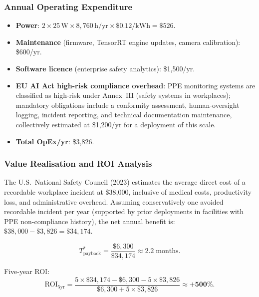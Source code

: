 \documentclass[11pt,a4paper]{article}
\begin{document}
\subsubsection*{Annual Operating Expenditure}

\begin{itemize}[leftmargin=*, noitemsep]
  \item \textbf{Power}: $2 \times 25\,\mathrm{W} \times 8{,}760\,\mathrm{h/yr}
    \times \$0.12/\mathrm{kWh} = \$526$.
  \item \textbf{Maintenance} (firmware, TensorRT engine updates,
    camera calibration): \$600/yr.
  \item \textbf{Software licence} (enterprise safety analytics):
    \$1,500/yr.
  \item \textbf{EU AI Act high-risk compliance overhead}: PPE
    monitoring systems are classified as high-risk under Annex~III
    (safety systems in workplaces); mandatory obligations include
    a conformity assessment, human-oversight logging, incident
    reporting, and technical documentation maintenance, collectively
    estimated at \$1,200/yr for a deployment of this scale.
  \item \textbf{Total OpEx/yr}: \$3,826.
\end{itemize}

\subsubsection*{Value Realisation and ROI Analysis}

The U.S.\ National Safety Council (2023) estimates the average
direct cost of a recordable workplace incident at \$38,000,
inclusive of medical costs, productivity loss, and administrative
overhead. Assuming conservatively one avoided recordable incident
per year (supported by prior deployments in facilities with PPE
non-compliance history), the net annual benefit is:
$\$38{,}000 - \$3{,}826 = \$34{,}174$.

\begin{equation*}
  T^*_\mathrm{payback} = \frac{\$6{,}300}{\$34{,}174}
  \approx \mathbf{2.2\;\mathrm{months}}.
\end{equation*}

Five-year ROI:
\begin{equation*}
  \mathrm{ROI}_{5\mathrm{yr}} =
  \frac{5 \times \$34{,}174 - \$6{,}300 - 5 \times \$3{,}826}
       {\$6{,}300 + 5 \times \$3{,}826}
  \approx +\mathbf{500\%}.
\end{equation*}
\end{document}
